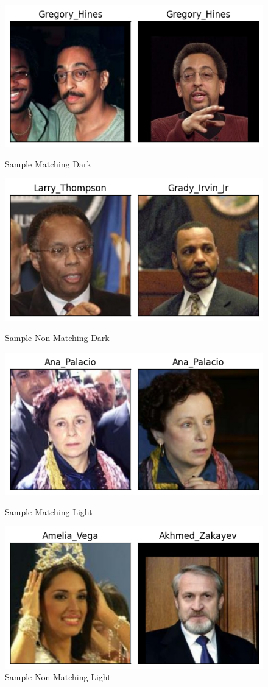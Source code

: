 \documentclass[conference]{IEEEtran}
\begin{document}
\begin{figure}[hbt!]
    \centering
    \includegraphics[height=0.3\linewidth]{latex/images/MatchingDark.png}
    \caption{Sample Matching Dark}
    \label{matching_dark}
    
    \centering
    \includegraphics[height=0.3\linewidth]{latex/images/NonMatchingDark.png}
    \caption{Sample Non-Matching Dark}
    \label{non_matching_dark}

    \centering
    \includegraphics[height=0.3\linewidth]{latex/images/MatchingLight.png}
    \caption{Sample Matching Light}
    \label{matching_dark}

    \centering
    \includegraphics[height=0.3\linewidth]{latex/images/NonMatchingLight.png}
    \caption{Sample Non-Matching Light}
    \label{non_matching_dark}
\end{figure}
\end{document}
